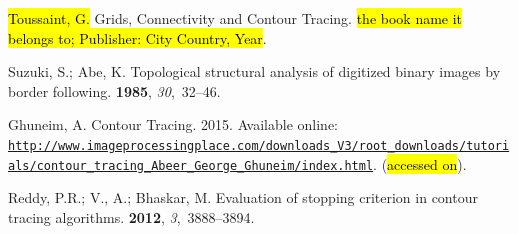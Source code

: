 \documentclass[sensors,article,accept,moreauthors,pdftex,10pt,a4paper]{mdpi}
\begin{document}
\begin{thebibliography}{999}
\hl{Toussaint, G.}
\newblock Grids, Connectivity and Contour Tracing. \hl{ the book name it belongs to; Publisher: City Country, Year}.

Suzuki, S.; Abe, K.
\newblock Topological structural analysis of digitized binary images by border
 following.
 {\bf 1985},
 {\em 30},~32--46.

Ghuneim, A.
\newblock Contour Tracing. 2015.
\newblock
 Available online: \href{http://www.imageprocessingplace.com/downloads\_V3/root\_downloads/tutorials/contour\_tracing\_Abeer\_George\_Ghuneim/index.html}
 {\nolinkurl{http://www.imageprocessingplace.com/downloads\_V3/root\_downloads/tutorials/contour\_tracing\_Abeer\_George\_Ghuneim/index.html}}.
(\hl{accessed on}).

Reddy, P.R.; V., A.; Bhaskar, M.
\newblock Evaluation of stopping criterion in contour tracing algorithms.
 {\bf 2012}, {\em 3},~3888--3894.

\end{thebibliography}



%


%
\end{document}
